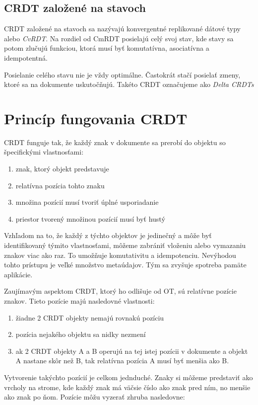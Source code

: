 \subsection{CRDT založené na stavoch}
CRDT založené na stavoch sa nazývajú konvergentné replikované dátové typy alebo \textit{CvRDT}.
Na rozdiel od CmRDT posielajú celý svoj stav, kde stavy sa potom zlučujú funkciou,
ktorá musí byť komutatívna, asociatívna a idempotentná.

Posielanie celého stavu nie je vždy optimálne. Častokrát stačí posielať zmeny, ktoré sa na dokumente
uskutočňujú. Takéto CRDT označujeme ako \textit{Delta CRDTs}

\section{Princíp fungovania CRDT}
CRDT funguje tak, že každý znak v dokumente sa prerobí do objektu so špecifickými vlastnosťami:
\begin{enumerate}
  \label{def_pozicie}
  \item znak, ktorý objekt predstavuje
  \item relatívna pozícia tohto znaku
  \item množina pozícií musí tvoriť úplné usporiadanie
  \item priestor tvorený množinou pozícií musí byť hustý
\end{enumerate}
Vzhľadom na to, že každý z týchto objektov je jedinečný a môže byť identifikovaný
týmito vlastnosťami, môžeme zabrániť vloženiu alebo vymazaniu znakov viac ako raz.
To umožňuje komutativitu a idempotenciu. Nevýhodou tohto prístupu je veľké množstvo metaúdajov.
Tým sa zvyšuje spotreba pamäte aplikácie.

Zaujímavým aspektom CRDT, ktorý ho odlišuje od OT, sú relatívne pozície znakov. Tieto pozície majú
nasledovné vlastnosti:
\begin{enumerate}
  \item žiadne 2 CRDT objekty nemajú rovnakú pozíciu
  \item pozícia nejakého objektu sa nidky nezmení
  \item ak 2 CRDT objekty A a B operujú na tej istej pozícii v dokumente a objekt A
  nastane skôr než B, tak relatívna pozícia A musí byť menšia ako B.
\end{enumerate}
Vytvorenie takýchto pozícií je celkom jednduché.
Znaky si môžeme predstaviť ako vrcholy na strome, kde každý znak má väčsie číslo ako znak pred
ním, no menšie ako znak po ňom. Pozície môžu vyzerať zhruba nasledovne:

